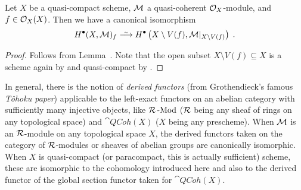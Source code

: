 \documentclass[a4paper,parskip=half,numbers=enddot, DIV=12]{scrreprt}
\begin{document}
\begin{prop}
	Let $X$ be a quasi-compact scheme, $\mathcal{M}$ a quasi-coherent $\mathcal{O}_X$-module, and $f\in\mathcal{O}_X(X)$. Then we have a canonical isomorphism
	\begin{align*}
		H^\bullet (X,\Mm)_f\isomorphism H^\bullet \left(X\setminus V(f),\Mm|_{X\setminus V(f)}\right)\;.
	\end{align*}
\end{prop}
\begin{proof}
	Follows from Lemma~. Note that the open subset $X\setminus V(f)\subseteq X$ is a scheme again by \cite[Fact~1.5.9]{alggeo1} and quasi-compact by \cite[Fact~2.1.2]{alggeo1}.
\end{proof}
\begin{rem*}
	In general, there is the notion of \emph{derived functors} (from Grothendieck's famous \emph{T\^{o}hoku paper}) applicable to the left-exact functors on an abelian category with sufficiently many injective objects, like $\mathcal{R}\operatorname{-Mod}$ ($\mathcal{R}$ being any sheaf of rings on any topological space) and $\cat{QCoh}(X)$ ($X$ being any prescheme). When $\mathcal{M}$ is an $\mathcal{R}$-module on any topological space $X$, the derived functors taken on the category of $\mathcal{R}$-modules or sheaves of abelian groups are canonically isomorphic. When $X$ is quasi-compact (or paracompact, this is actually sufficient) scheme, these are isomorphic to the cohomology introduced here and also to the derived functor of the global section functor taken for $\cat{QCoh}(X)$.
\end{rem*}
\end{document}
